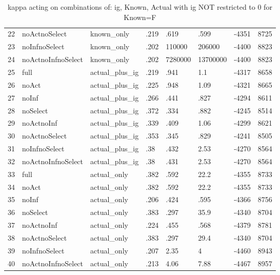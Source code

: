\begin{table}[ht]
\begin{tabular}{rlllllll}
  22 & noActnoSelect & known\_only & .219 & .619 & .599 & -4351 & 8725 \\ 
  23 & noInfnoSelect & known\_only & .202 & 110000 & 206000 & -4400 & 8823 \\ 
  24 & noActnoInfnoSelect & known\_only & .202 & 7280000 & 13700000 & -4400 & 8823 \\ 
  25 & full & actual\_plus\_ig & .219 & .941 & 1.1 & -4317 & 8658 \\ 
  26 & noAct & actual\_plus\_ig & .225 & .948 & 1.09 & -4321 & 8665 \\ 
  27 & noInf & actual\_plus\_ig & .266 & .441 & .827 & -4294 & 8611 \\ 
  28 & noSelect & actual\_plus\_ig & .372 & .334 & .882 & -4245 & 8514 \\ 
  29 & noActnoInf & actual\_plus\_ig & .339 & .409 & 1.06 & -4299 & 8621 \\ 
  30 & noActnoSelect & actual\_plus\_ig & .353 & .345 & .829 & -4241 & 8505 \\ 
  31 & noInfnoSelect & actual\_plus\_ig & .38 & .432 & 2.53 & -4270 & 8564 \\ 
  32 & noActnoInfnoSelect & actual\_plus\_ig & .38 & .431 & 2.53 & -4270 & 8564 \\ 
  33 & full & actual\_only & .382 & .592 & 22.2 & -4355 & 8733 \\ 
  34 & noAct & actual\_only & .382 & .592 & 22.2 & -4355 & 8733 \\ 
  35 & noInf & actual\_only & .206 & .424 & .595 & -4366 & 8756 \\ 
  36 & noSelect & actual\_only & .383 & .297 & 35.9 & -4340 & 8704 \\ 
  37 & noActnoInf & actual\_only & .224 & .455 & .568 & -4379 & 8781 \\ 
  38 & noActnoSelect & actual\_only & .383 & .297 & 29.4 & -4340 & 8704 \\ 
  39 & noInfnoSelect & actual\_only & .207 & 2.35 & 4 & -4460 & 8943 \\ 
  40 & noActnoInfnoSelect & actual\_only & .213 & 4.06 & 7.88 & -4467 & 8957 \\ 
   \hline
\end{tabular}
\caption{kappa acting on combinations of: ig, Known, Actual with ig NOT restricted to 0 for Known=F} 
\end{table}

